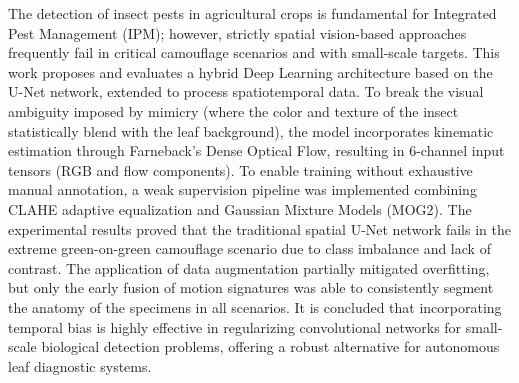 
\begin{abstractutfpr}%
The detection of insect pests in agricultural crops is fundamental for Integrated Pest Management (IPM); however, strictly spatial vision-based approaches frequently fail in critical camouflage scenarios and with small-scale targets. This work proposes and evaluates a hybrid Deep Learning architecture based on the U-Net network, extended to process spatiotemporal data. To break the visual ambiguity imposed by mimicry (where the color and texture of the insect statistically blend with the leaf background), the model incorporates kinematic estimation through Farneback's Dense Optical Flow, resulting in 6-channel input tensors (RGB and flow components). To enable training without exhaustive manual annotation, a weak supervision pipeline was implemented combining CLAHE adaptive equalization and Gaussian Mixture Models (MOG2). The experimental results proved that the traditional spatial U-Net network fails in the extreme green-on-green camouflage scenario due to class imbalance and lack of contrast. The application of data augmentation partially mitigated overfitting, but only the early fusion of motion signatures was able to consistently segment the anatomy of the specimens in all scenarios. It is concluded that incorporating temporal bias is highly effective in regularizing convolutional networks for small-scale biological detection problems, offering a robust alternative for autonomous leaf diagnostic systems.
\end{abstractutfpr}
